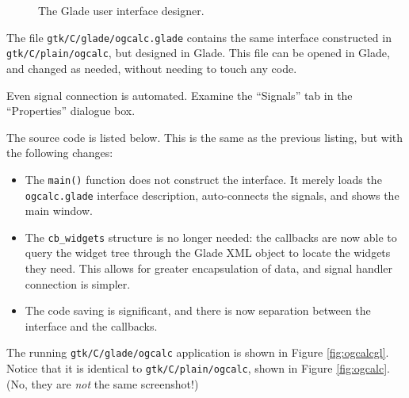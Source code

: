\documentclass[a4paper,oneside]{article}
\newcommand{\filename}[1]{\texttt{#1}}
\newcommand{\program}[1]{\texttt{#1}}
\newcommand{\class}[1]{\texttt{#1}}
\newcommand{\function}[1]{\texttt{#1()}}
\begin{document}
\begin{figure}
{{    }
    \label{fig:glade:tree}
  }
  \caption[The Glade user interface designer]{The Glade user interface
    designer.}
  \label{fig:glade}
\end{figure}

The file \filename{gtk/C/glade/ogcalc.glade} contains the same interface
constructed in \program{gtk/C/plain/ogcalc}, but designed in Glade.  This
file can be opened in Glade, and changed as needed, without needing to
touch any code.

Even signal connection is automated.  Examine the ``Signals'' tab in
the ``Properties'' dialogue box.

The source code is listed below.  This is the same as the previous
listing, but with the following changes:

\begin{itemize}
\item The \function{main} function does not construct the interface.
  It merely loads the \filename{ogcalc.glade} interface description,
  auto-connects the signals, and shows the main window.
\item The \class{cb\_widgets} structure is no longer needed: the
  callbacks are now able to query the widget tree through the Glade
  XML object to locate the widgets they need.  This allows for greater
  encapsulation of data, and signal handler connection is simpler.
\item The code saving is significant, and there is now separation
  between the interface and the callbacks.
\end{itemize}

The running \program{gtk/C/glade/ogcalc} application is shown in Figure
\ref{fig:ogcalcgl}.  Notice that it is identical to
\program{gtk/C/plain/ogcalc}, shown in Figure \ref{fig:ogcalc}.  (No, they
are \emph{not} the same screenshot!)
\end{document}
